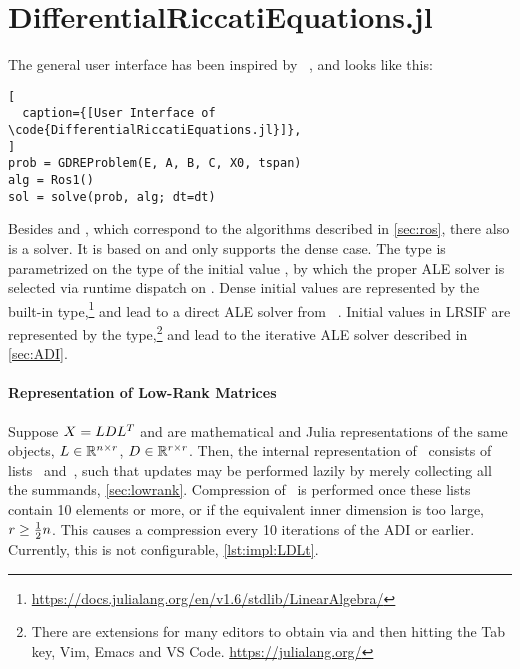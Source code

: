 \section{DifferentialRiccatiEquations.jl}
\label{sec:impl:DRE}

%

The general user interface has been inspired by ~\cite{DifferentialEquations},
and looks like this:
\begin{lstlisting}[
  caption={[User Interface of \code{DifferentialRiccatiEquations.jl}]},
]
prob = GDREProblem(E, A, B, C, X0, tspan)
alg = Ros1()
sol = solve(prob, alg; dt=dt)
\end{lstlisting}
Besides  and ,
which correspond to the algorithms described in \autoref{sec:ros},
there also is a  solver.
It is based on \cite[Appendix~A]{Lang2017} and only supports the dense case.
The  type is parametrized on the type of the initial value ,
by which the proper \ac{ALE} solver is selected via runtime dispatch on .
Dense initial values are represented by the built-in  type,\footnote{%
  \url{https://docs.julialang.org/en/v1.6/stdlib/LinearAlgebra/}}
and lead to a direct \ac{ALE} solver from ~\cite{MatrixEquations}.
Initial values in \ac{LRSIF} are represented by the \julia{\LDLt} type,\footnote{%
  There are extensions for many editors to obtain \julia{\LDLt} via
   and then hitting the Tab key,
  \eg Vim, Emacs and VS Code.
  \cf \url{https://julialang.org/}
}
and lead to the iterative \ac{ALE} solver described in \autoref{sec:ADI}.

\paragraph{Representation of Low-Rank Matrices}

Suppose $X = LDL^T$ and  are mathematical and Julia representations of the same objects,
$L\in\mathbb{R}^{n\times r}$, $D\in\mathbb{R}^{r\times r}$.
Then, the internal representation of~ consists of lists~\julia{[L]} and~\julia{[D]},
such that updates may be performed lazily by merely collecting all the summands,
\cf \autoref{sec:lowrank}.
Compression of~ is performed once these lists contain 10 elements or more,
or if the equivalent inner dimension is too large, $r \geq \tfrac{1}{2} n$.
This causes a compression every 10 iterations of the \ac{ADI} or earlier.
Currently, this is not configurable,
\cf \autoref{lst:impl:LDLt}.

